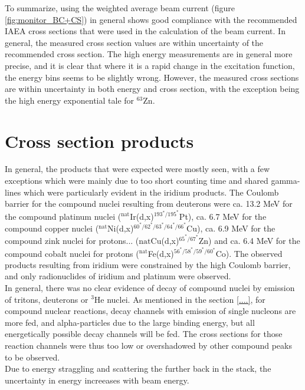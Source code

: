 \noindent 
To summarize, using the weighted average beam current (figure \ref{fig:monitor_BC+CS}) in general shows good compliance with the recommended IAEA cross sections that were used in the calculation of the beam current. In general, the measured cross section values are within uncertainty of the recommended cross section. The high energy measurements are in general more precise, and it is clear that where it is a rapid change in the excitation function, the energy bins seems to be slightly wrong. However, the measured cross sections are within uncertainty in both energy and cross section, with the exception being the high energy exponential tale for $^{63}$Zn. 

\section{Cross section products}

In general, the products that were expected were mostly seen, with a few exceptions which were mainly due to too short counting time and shared gamma-lines which were particularly evident in the iridium products. The Coulomb barrier for the compound nuclei resulting from deuterons were ca. 13.2 MeV for the compound platinum nuclei ($^\text{nat}$Ir(d,x)$^{193^*/195^*}$Pt), ca. 6.7 MeV for the compound copper nuclei ($^\text{nat}$Ni(d,x)$^{60^*/62^*/63^*/64^*/66^*}$Cu), ca. 6.9 MeV for the compound zink nuclei for protons... ($\text{nat}$Cu(d,x)$^{65^*/67^*}$Zn) and ca. 6.4 MeV for the compound cobalt nuclei for protons  ($^\text{nat}$Fe(d,x)$^{56^*/58^*/59^*/60^*}$Co). The observed products resulting from iridium were constrained by the high Coulomb barrier, and only radionuclides of iridium and platinum were observed. \\

In general, there was no clear evidence of decay of compound nuclei by emission of tritons, deuterons or $^{3}$He nuclei. As mentioned in the section \ref{....}, for compound nuclear reactions, decay channels with emission of single nucleons are more fed, and alpha-particles due to the large binding energy, but all energetically possible decay channels will be fed. The cross sections for those reaction channels were thus too low or overshadowed by other compound peaks to be observed. \\

Due to energy straggling and scattering the further back in the stack, the uncertainty in energy increeases with beam energy. 



